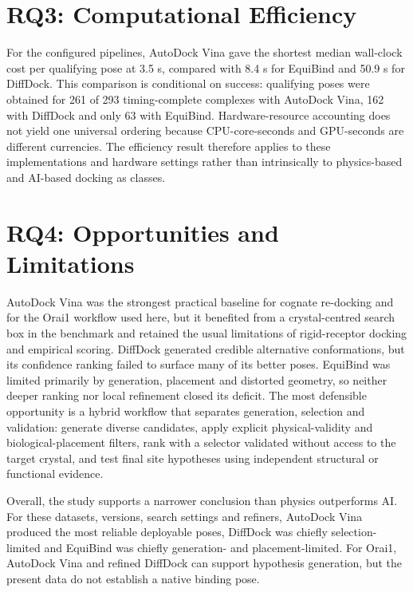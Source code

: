 \hypertarget{rq3-computational-efficiency}{%
\section{RQ3: Computational Efficiency}\label{rq3-computational-efficiency}}

For the configured pipelines, AutoDock Vina gave the shortest median wall-clock cost per qualifying pose at 3.5 s, compared with 8.4 s for EquiBind and 50.9 s for DiffDock. This comparison is conditional on success: qualifying poses were obtained for 261 of 293 timing-complete complexes with AutoDock Vina, 162 with DiffDock and only 63 with EquiBind. Hardware-resource accounting does not yield one universal ordering because CPU-core-seconds and GPU-seconds are different currencies. The efficiency result therefore applies to these implementations and hardware settings rather than intrinsically to physics-based and AI-based docking as classes.

\hypertarget{rq4-opportunities-and-limitations}{%
\section{RQ4: Opportunities and Limitations}\label{rq4-opportunities-and-limitations}}

AutoDock Vina was the strongest practical baseline for cognate re-docking and for the Orai1 workflow used here, but it benefited from a crystal-centred search box in the benchmark and retained the usual limitations of rigid-receptor docking and empirical scoring. DiffDock generated credible alternative conformations, but its confidence ranking failed to surface many of its better poses. EquiBind was limited primarily by generation, placement and distorted geometry, so neither deeper ranking nor local refinement closed its deficit. The most defensible opportunity is a hybrid workflow that separates generation, selection and validation: generate diverse candidates, apply explicit physical-validity and biological-placement filters, rank with a selector validated without access to the target crystal, and test final site hypotheses using independent structural or functional evidence.

Overall, the study supports a narrower conclusion than physics outperforms AI. For these datasets, versions, search settings and refiners, AutoDock Vina produced the most reliable deployable poses, DiffDock was chiefly selection-limited and EquiBind was chiefly generation- and placement-limited. For Orai1, AutoDock Vina and refined DiffDock can support hypothesis generation, but the present data do not establish a native binding pose.

